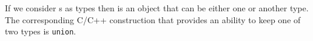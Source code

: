 \begin{example}[Sum][\textbf{C++}]
  \label{ex:cpp_sum}
  If we consider s as types then
   is an object that can be either one or another
  type. The corresponding C/C++ construction that provides an ability
  to keep one of two types is \texttt{union}. 

    
          


\end{example}
